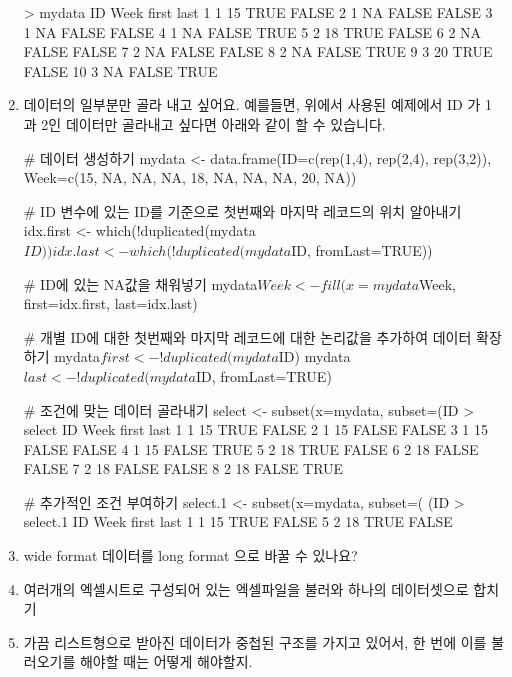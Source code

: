 \documentclass{article}
\begin{document}
\begin{enumerate}
\begin{Schunk}
\begin{Soutput}
> mydata
   ID Week first  last
1   1   15  TRUE FALSE
2   1   NA FALSE FALSE
3   1   NA FALSE FALSE
4   1   NA FALSE  TRUE
5   2   18  TRUE FALSE
6   2   NA FALSE FALSE
7   2   NA FALSE FALSE
8   2   NA FALSE  TRUE
9   3   20  TRUE FALSE
10  3   NA FALSE  TRUE
	\end{Soutput}	
\end{Schunk}

\item 데이터의 일부분만 골라 내고 싶어요.  예를들면, 위에서 사용된 예제에서 ID 가 1과 2인 데이터만 골라내고 싶다면 아래와 같이 할 수 있습니다. 

\begin{Schunk}
\begin{Soutput}
# 데이터 생성하기
mydata <- data.frame(ID=c(rep(1,4), rep(2,4), rep(3,2)), Week=c(15, NA, NA, NA, 18, NA, NA, NA, 20, NA))

# ID 변수에 있는 ID를 기준으로 첫번째와 마지막 레코드의 위치 알아내기 
idx.first <- which(!duplicated(mydata$ID))
idx.last <- which(!duplicated(mydata$ID, fromLast=TRUE))

# ID에 있는 NA값을 채워넣기 
mydata$Week <- fill(x=mydata$Week, first=idx.first, last=idx.last)

# 개별 ID에 대한 첫번째와 마지막 레코드에 대한 논리값을 추가하여 데이터 확장하기 
mydata$first <- !duplicated(mydata$ID)
mydata$last <- !duplicated(mydata$ID, fromLast=TRUE)

# 조건에 맞는 데이터 골라내기 
select <- subset(x=mydata, subset=(ID %
> select
  ID Week first  last
1  1   15  TRUE FALSE
2  1   15 FALSE FALSE
3  1   15 FALSE FALSE
4  1   15 FALSE  TRUE
5  2   18  TRUE FALSE
6  2   18 FALSE FALSE
7  2   18 FALSE FALSE
8  2   18 FALSE  TRUE

# 추가적인 조건 부여하기
select.1 <- subset(x=mydata, subset=( (ID %
> select.1
  ID Week first  last
1  1   15  TRUE FALSE
5  2   18  TRUE FALSE
\end{Soutput}
\end{Schunk}

\item wide format 데이터를 long format 으로 바꿀 수 있나요? 


\item 여러개의 엑셀시트로 구성되어 있는 엑셀파일을 불러와 하나의 데이터셋으로 합치기

\item 가끔 리스트형으로 받아진 데이터가 중첩된 구조를 가지고 있어서, 한 번에 이를 불러오기를 해야할 때는 어떻게 해야할지.


\end{enumerate}
\end{document}
